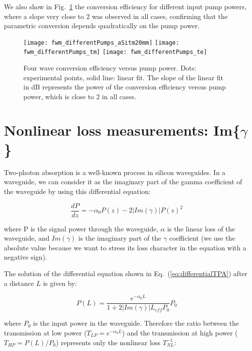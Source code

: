We also show in Fig.~\ref{fig:fwmDifferentPump} the conversion efficiency for different input pump powers, where a slope very close to 2 was observed in all cases, confirming that the parametric conversion depends quadratically on the pump power.

\begin{figure}[htb]
    \centering
    \texttt{[image: fwm\_differentPumps\_aSitm20mm]}
    \texttt{[image: fwm\_differentPumps\_tm]}
    \texttt{[image: fwm\_differentPumps\_te]}
    \caption{Four wave conversion efficiency versus pump power. Dots: experimental points, solid line: linear fit. The slope of the linear fit in dB represents the power of the conversion efficiency versus pump power, which is close to 2 in all cases.}
    \label{fig:fwmDifferentPump}
\end{figure}






\section{Nonlinear loss measurements: Im\{$ \gamma $\}}
\label{sec:imGamma}
Two-photon absorption is a well-known process in silicon waveguides.
In a waveguide, we can consider it as the imaginary part of the gamma coefficient of the waveguide by using this differential equation:

\begin{equation}
 \frac{dP}{dz} = -\alpha_0 P(z) - 2|Im(\gamma)| P(z)^2 
\label{eq:differentialTPA}
\end{equation}

where P is the signal power through the waveguide, $\alpha$ is the linear loss of the waveguide, and $Im(\gamma)$ is the imaginary part of the $\gamma$ coefficient (we use the absolute value because we want to stress its loss character in the equation with a negative sign). 

The solution of the differential equation shown in Eq.~(\ref{eq:differentialTPA}) after a distance $L$ is given by:

\begin{equation}
 P(L) = \frac{e^{-\alpha_0 L}}{1+2|Im(\gamma)| L_{eff} P_0} P_0
\end{equation}

where $P_0$ is the input power in the waveguide. Therefore the ratio between the transmission at low power ($T_{LP} = e^{-\alpha_0 L} $) and the transmission at high power ($T_{HP} = P(L)/P_0 $) represents only the nonlinear loss $T_{NL}^{-1}$:


